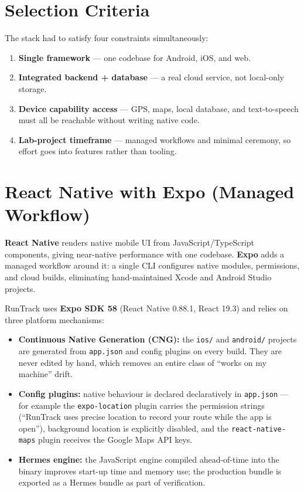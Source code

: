 \documentclass[12pt, a4paper]{report}
\newcommand{\pkg}[1]{\texttt{#1}}
\newcommand{\code}[1]{\texttt{#1}}
\begin{document}
\section{Selection Criteria}
The stack had to satisfy four constraints simultaneously:

\begin{enumerate}[leftmargin=1.2cm]
  \item \textbf{Single framework} --- one codebase for Android, iOS, and web.
  \item \textbf{Integrated backend + database} --- a real cloud service, not
        local-only storage.
  \item \textbf{Device capability access} --- GPS, maps, local database, and
        text-to-speech must all be reachable without writing native code.
  \item \textbf{Lab-project timeframe} --- managed workflows and minimal
        ceremony, so effort goes into features rather than tooling.
\end{enumerate}

\section{React Native with Expo (Managed Workflow)}
\textbf{React Native} renders native mobile UI from JavaScript/TypeScript
components, giving near-native performance with one codebase. \textbf{Expo}
adds a managed workflow around it: a single CLI configures native modules,
permissions, and cloud builds, eliminating hand-maintained Xcode and Android
Studio projects.

RunTrack uses \textbf{Expo SDK 58} (React Native 0.88.1, React 19.3) and
relies on three platform mechanisms:

\begin{itemize}[leftmargin=1.2cm]
  \item \textbf{Continuous Native Generation (CNG):} the \code{ios/} and
        \code{android/} projects are generated from \code{app.json} and
        config plugins on every build. They are never edited by hand, which
        removes an entire class of ``works on my machine'' drift.
  \item \textbf{Config plugins:} native behaviour is declared
        declaratively in \code{app.json} --- for example the
        \pkg{expo-location} plugin carries the permission strings
        (``RunTrack uses precise location to record your route while the app
        is open''), background location is explicitly disabled, and the
        \pkg{react-native-maps} plugin receives the Google Maps API keys.
  \item \textbf{Hermes engine:} the JavaScript engine compiled ahead-of-time
        into the binary improves start-up time and memory use; the production
        bundle is exported as a Hermes bundle as part of verification.
\end{itemize}
\end{document}
